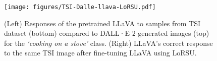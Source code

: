\begin{figure}[t]
\vskip 0.2in
    \centering   \texttt{[image: figures/TSI-Dalle-llava-LoRSU.pdf]}
\caption{(Left) Responses of the pretrained LLaVA to samples from  TSI dataset (bottom) compared to DALL·E 2 generated images (top) for the \textit{`cooking on a stove'} class. (Right) LLaVA’s correct response to the same TSI image after fine-tuning LLaVA using LoRSU.}
\label{fig:dalle_tsi}
\vskip -0.2in
\end{figure}